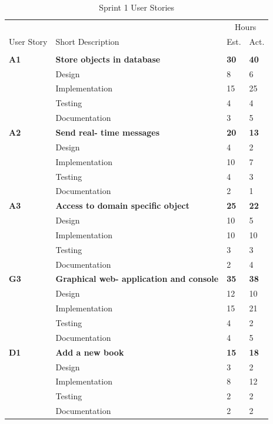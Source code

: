\begin{table}
\caption{Sprint 1 User Stories}
\centering
\begin{tabular}{ l p{8cm} l l }
\hline 
			&				&\multicolumn{2}{c}{Hours}			\\
 User Story	& Short Description		&Est.		&Act.	                               \\ 
\hline \\ [-2.0ex]
 \bf{A1}     &\bf{Store objects in database}		&\bf{30}		&\bf{40}          \\ 
		  &Design							&8			&6		\\
		  &Implementation					&15			&25		\\
		  &Testing						&4			&4		\\
		  &Documentation					&3			&5		\\

 \bf{A2}     &\bf{Send real- time messages} 		&\bf{20}		&\bf{13}               \\ 
		  &Design							&4			&2		\\
		  &Implementation					&10			&7		\\
		  &Testing						&4			&3		\\
		  &Documentation					&2			&1		\\

 \bf{A3}     &\bf{Access to domain specific object} 	&\bf{25}		&\bf{22}		     \\ 
		  &Design							&10			&5		\\
		  &Implementation					&10			&10		\\
		  &Testing						&3			&3		\\
		  &Documentation					&2			&4		\\

 \bf{G3}     &\bf{Graphical web- application and console}		&\bf{35}		&\bf{38}		     \\ 
		  &Design							&12			&10		\\
		  &Implementation					&15			&21		\\
		  &Testing						&4			&2		\\
		  &Documentation					&4			&5		\\

 \bf{D1}	  &\bf{Add a new book}				&\bf{15}		&\bf{18}		     \\
		  &Design							&3			&2		\\
		  &Implementation					&8			&12		\\
		  &Testing						&2			&2		\\
		  &Documentation					&2			&2		\\


\end{tabular}
\end{table}
